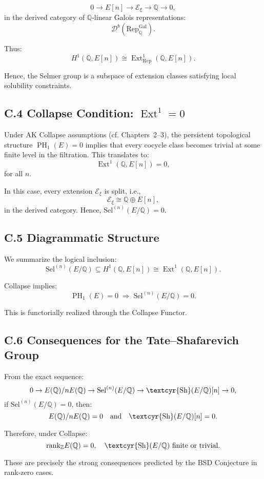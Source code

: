 \documentclass[11pt]{article}
\DeclareMathOperator{\Ext}{Ext}
\DeclareMathOperator{\PH}{PH}
\newcommand{\QQ}{\mathbb{Q}}
\newcommand{\ZZ}{\mathbb{Z}}
\newcommand{\Sha}{\text{\textcyr{Sh}}}
\begin{document}
\[
0 \to E[n] \to \mathcal{E}_\xi \to \QQ \to 0,
\]
in the derived category of $\QQ$-linear Galois representations:
\[
\mathcal{D}^b(\mathrm{Rep}_{\QQ}^{\text{Gal}}).
\]

Thus:
\[
H^1(\QQ,E[n]) \cong \Ext^1_{\mathrm{Rep}}(\QQ, E[n]).
\]

Hence, the Selmer group is a subspace of extension classes satisfying local solubility constraints.

\subsection*{C.4 Collapse Condition: $\Ext^1 = 0$}

Under AK Collapse assumptions (cf. Chapters~2–3), the persistent topological structure $\PH_1(E)=0$ implies that every cocycle class becomes trivial at some finite level in the filtration.  
This translates to:
\[
\Ext^1(\QQ,E[n]) = 0,
\]
for all $n$.

In this case, every extension $\mathcal{E}_\xi$ is split, i.e.,
\[
\mathcal{E}_\xi \cong \QQ \oplus E[n],
\]
in the derived category.  
Hence, $\mathrm{Sel}^{(n)}(E/\QQ) = 0$.

\subsection*{C.5 Diagrammatic Structure}

We summarize the logical inclusion:
\[
\mathrm{Sel}^{(n)}(E/\QQ) \subseteq H^1(\QQ,E[n]) \cong \Ext^1(\QQ,E[n]).
\]

Collapse implies:
\[
\PH_1(E) = 0 \;\Rightarrow\; \mathrm{Sel}^{(n)}(E/\QQ) = 0.
\]

This is functorially realized through the Collapse Functor.

\subsection*{C.6 Consequences for the Tate–Shafarevich Group}

From the exact sequence:
\[
0 \to E(\QQ)/nE(\QQ) \to \mathrm{Sel}^{(n)}(E/\QQ) \to \Sha(E/\QQ)[n] \to 0,
\]
if $\mathrm{Sel}^{(n)}(E/\QQ) = 0$, then:
\[
E(\QQ)/nE(\QQ) = 0 \quad \text{and} \quad \Sha(E/\QQ)[n] = 0.
\]

Therefore, under Collapse:
\[
\mathrm{rank}_{\ZZ} E(\QQ) = 0, \quad \Sha(E/\QQ) \text{ finite or trivial}.
\]

These are precisely the strong consequences predicted by the BSD Conjecture in rank-zero cases.
\end{document}
